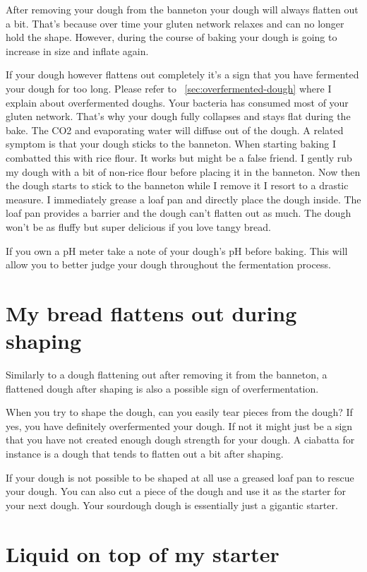 After removing your dough from the banneton your dough will always
flatten out a bit. That's because over time your gluten network
relaxes and can no longer hold the shape. However, during the course
of baking your dough is going to increase in size and inflate again.

If your dough however flattens out completely it's a sign that
you have fermented your dough for too long. Please refer to ~\ref{sec:overfermented-dough}
where I explain about overfermented doughs. Your bacteria
has consumed most of your gluten network. That's why your
dough fully collapses and stays flat during the bake. The
CO2 and evaporating water will diffuse out of the dough.
A related symptom is that your dough sticks to the banneton.
When starting baking I combatted this with rice flour.
It works but might be a false friend. I gently rub my
dough with a bit of non-rice flour before placing it in
the banneton. Now then the dough starts to stick to the banneton
while I remove it I resort to a drastic measure. I immediately
grease a loaf pan and directly place the dough inside. The loaf
pan provides a barrier and the dough can't flatten out as much.
The dough won't be as fluffy but super delicious if you love tangy bread.

If you own a pH meter take a note of your dough's pH before baking.
This will allow you to better judge your dough throughout
the fermentation process.

\section{My bread flattens out during shaping}

Similarly to a dough flattening out after removing it from the banneton,
a flattened dough after shaping is also a possible sign of overfermentation.

When you try to shape the dough, can you easily tear pieces from the dough?
If yes, you have definitely overfermented your dough. If not it might just
be a sign that you have not created enough dough strength for your dough.
A ciabatta for instance is a dough that tends to flatten out a bit after shaping.

If your dough is not possible to be shaped at all use a greased loaf pan
to rescue your dough. You can also cut a piece of the dough and use it
as the starter for your next dough. Your sourdough dough is essentially
just a gigantic starter.

\section{Liquid on top of my starter}

